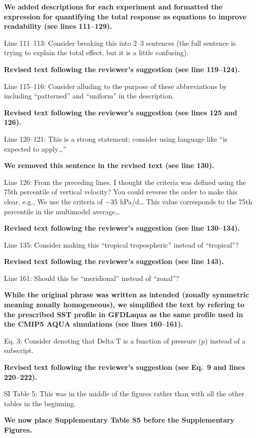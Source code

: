 \documentclass[11pt]{article}
\begin{document}
\textbf{We added descriptions for each experiment and formatted the expression for quantifying the total response as equations to improve readability (see lines 111--129).}

Line 111--113: Consider breaking this into 2--3 sentences (the full sentence is trying to explain the total effect, but it is a little confusing).

\textbf{Revised text following the reviewer's suggestion (see line 119--124).}

Line 115--116: Consider alluding to the purpose of these abbreviations by including ``patterned'' and ``uniform'' in the description.

\textbf{Revised text following the reviewer's suggestion (see lines 125 and 126).}

Line 120--121: This is a strong statement; consider using language like ``is expected to apply\ldots{}''

\textbf{We removed this sentence in the revised text (see line 130).}

Line 126: From the preceding lines, I thought the criteria was defined using the 75th percentile of vertical velocity? You could reverse the order to make this clear, e.g., We use the criteria of \(-35\) hPa/d\ldots{} This value corresponds to the 75th percentile in the multimodel average\ldots{}

\textbf{Revised text following the reviewer's suggestion (see line 130--134).}

Line 135: Consider making this ``tropical tropospheric'' instead of ``tropical''?

\textbf{Revised text following the reviewer's suggestion (see line 143).}

Line 161: Should this be ``meridional'' instead of ``zonal''?

\textbf{While the original phrase was written as intended (zonally symmetric meaning zonally homogeneous), we simplified the text by refering to the prescribed SST profile in GFDLaqua as the same profile used in the CMIP5 AQUA simulations (see lines 160--161).}

Eq. 3: Consider denoting that Delta T is a function of pressure (p) instead of a subscript.

\textbf{Revised text following the reviewer's suggestion (see Eq.~9 and lines 220--222).}

SI Table 5: This was in the middle of the figures rather than with all the other tables in the beginning.

\textbf{We now place Supplementary Table S5 before the Supplementary Figures.}
\end{document}
